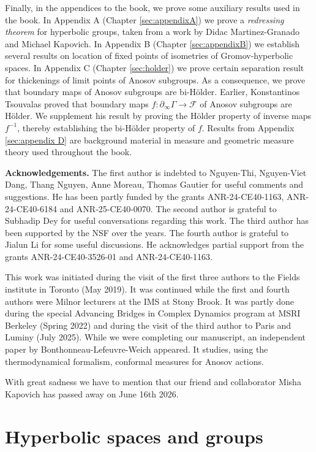 \documentclass[12pt]{amsbook}%
\theoremstyle{definition}
\theoremstyle{remark}
\numberwithin{section}{chapter}
\numberwithin{subsection}{section}
\numberwithin{figure}{chapter}
\def\cF{{\mathscr{F}}}
\def\Ga{\Gamma}
\def\geo{\partial_\infty}
\begin{document}
Finally, in the appendices to the book, we prove some auxiliary results used in the book. In Appendix A (Chapter \ref{sec:appendixA}) we prove a {\em redressing theorem} for hyperbolic groups, taken from a work by Didac Martinez-Granado and Michael Kapovich. In Appendix B (Chapter \ref{sec:appendixB})  we establish several results on location of fixed points of isometries of Gromov-hyperbolic spaces. 
In Appendix C (Chapter \ref{sec:holder}) we prove certain separation result for thickenings of limit points of Anosov subgroups. 
As a consequence, we prove that boundary maps of Anosov subgroups are bi-H\"older. 
Earlier, Konstantinos Tsouvalas proved that boundary maps $f: \geo \Ga\to \cF$ of Anosov subgroups are H\"older. We supplement his result by proving the H\"older property of inverse maps $f^{-1}$, thereby establishing the bi-H\"older property of $f$. 
Results from Appendix \ref{sec:appendix D} are background material in measure and geometric measure theory used throughout the book. 


\medskip
{\bf Acknowledgements.} The first author is indebted to Nguyen-Thi, Nguyen-Viet Dang, Thang Nguyen, Anne Moreau, Thomas Gautier for useful comments and suggestions. He has been partly funded by the grants
ANR-24-CE40-1163, ANR-24-CE40-6184 and ANR-25-CE40-0070. The second author is grateful to Subhadip Dey for useful conversations regarding this work. The third author has been supported by the NSF over the years. 
The fourth author is grateful to Jialun Li for some useful discussions. He acknowledges partial support from the grants ANR-24-CE40-3526-01 and ANR-24-CE40-1163. 

This work was initiated during the visit of the first three authors to the Fields institute in Toronto (May 2019). It was continued while the first and fourth authors were Milnor lecturers at the IMS at Stony Brook. 
  It was partly done during the special Advancing Bridges in Complex Dynamics program at MSRI Berkeley (Spring 2022) and during the visit of the third author to Paris and Luminy (July 2025).
 While we were completing  our manuscript, an  independent paper by Bonthonneau-Lefeuvre-Weich \cite{bonthonneau_lefeuvre_weich}
 appeared. It studies, using the thermodynamical formalism,  conformal measures for Anosov actions.  
  
  With great sadness we have to mention that our friend and collaborator Misha Kapovich has passed away on June 16th 2026. 
 

\chapter{Hyperbolic spaces and groups}\label{sec:hyperbolic}
\end{document}
